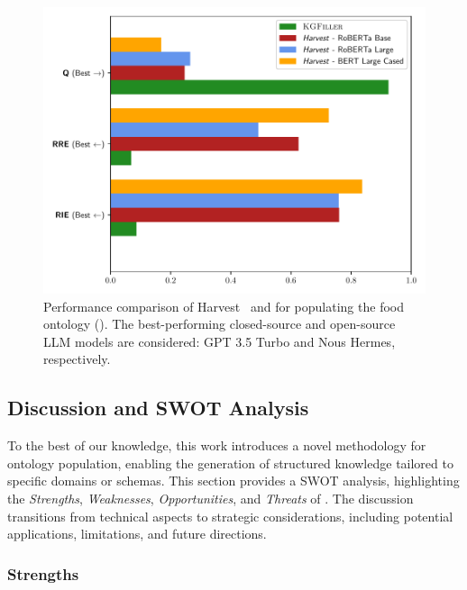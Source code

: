 \begin{figure}
    \centering
    \includegraphics[width=\linewidth]{figures/kgfiller/comparison}
    \caption[Performance Comparison of Harvest and \llmfkg{}]{
        Performance comparison of Harvest~\cite{HaoTTNSZXH23} and \llmfkg{} for populating the food ontology ().
        The best-performing closed-source and open-source \gls{LLM} models are considered: GPT 3.5 Turbo and Nous Hermes, respectively.
    }
    \label{fig:compare-performance}
\end{figure}



\subsection{Discussion and \gls{SWOT} Analysis}
\label{subsec:discussion}

To the best of our knowledge, this work introduces a novel methodology for ontology population, enabling the generation of structured knowledge tailored to specific domains or schemas.
%
This section provides a \gls{SWOT} analysis, highlighting the \textit{Strengths}, \textit{Weaknesses}, \textit{Opportunities}, and \textit{Threats} of \llmfkg{}.
%
The discussion transitions from technical aspects to strategic considerations, including potential applications, limitations, and future directions.

\subsubsection{Strengths}
\label{subsubsec:strengths}

